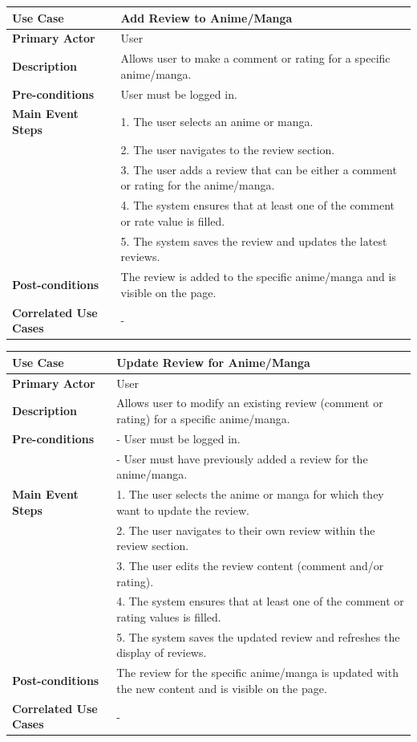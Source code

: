 \begin{longtable}{|p{}|p{}|}
    \hline
    \rowcolor{lightblue}
    \textbf{Use Case} & \textbf{Add Review to Anime/Manga} \\
    \hline
    \textbf{Primary Actor} & User \\
    \hline
    \textbf{Description} & Allows user to make a comment or rating for a specific anime/manga. \\
    \hline
    \textbf{Pre-conditions} & User must be logged in. \\
    \hline
    \textbf{Main Event Steps} &  1. The user selects an anime or manga. \\
    & 2. The user navigates to the review section. \\
    & 3. The user adds a review that can be either a comment or rating for the anime/manga. \\
    & 4. The system ensures that at least one of the comment or rate value is filled. \\
    & 5. The system saves the review and updates the latest reviews. \\
    \hline
    \textbf{Post-conditions} & The review is added to the specific anime/manga and is visible on the page. \\
    \hline
    \textbf{Correlated Use Cases} & - \\
    \hline
\end{longtable}

\begin{longtable}{|p{}|p{}|}
    \hline
    \rowcolor{lightblue}
    \textbf{Use Case} & \textbf{Update Review for Anime/Manga} \\
    \hline
    \textbf{Primary Actor} & User \\
    \hline
    \textbf{Description} & Allows user to modify an existing review (comment or rating) for a specific anime/manga. \\
    \hline
    \textbf{Pre-conditions} & - User must be logged in. \\
    & - User must have previously added a review for the anime/manga. \\
    \hline
    \textbf{Main Event Steps} & 1. The user selects the anime or manga for which they want to update the review. \\
    & 2. The user navigates to their own review within the review section. \\
    & 3. The user edits the review content (comment and/or rating). \\
    & 4. The system ensures that at least one of the comment or rating values is filled. \\
    & 5. The system saves the updated review and refreshes the display of reviews. \\
    \hline
    \textbf{Post-conditions} & The review for the specific anime/manga is updated with the new content and is visible on the page. \\
    \hline
    \textbf{Correlated Use Cases} & - \\
    \hline
\end{longtable}

